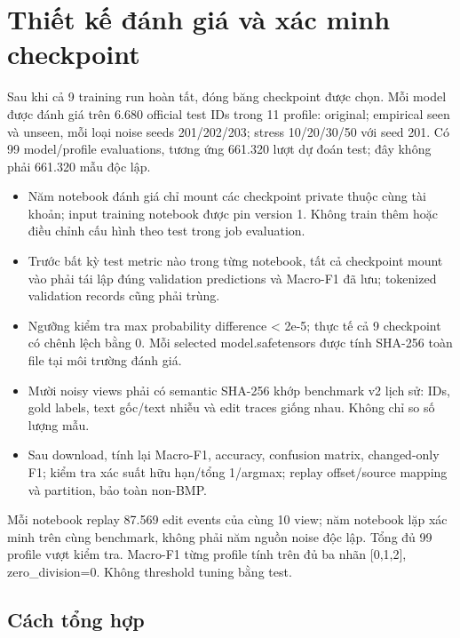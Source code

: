 \documentclass[11pt,a4paper]{article}
\begin{document}
\FloatBarrier\section{Thiết kế đánh giá và xác minh checkpoint}

Sau khi cả 9 training run hoàn tất, đóng băng checkpoint được chọn. Mỗi model được đánh giá trên 6.680 official test IDs trong 11 profile: original; empirical seen và unseen, mỗi loại noise seeds 201/202/203; stress 10/20/30/50 với seed 201. Có 99 model/profile evaluations, tương ứng 661.320 lượt dự đoán test; đây không phải 661.320 mẫu độc lập.


\begin{itemize}

\item Năm notebook đánh giá chỉ mount các checkpoint private thuộc cùng tài khoản; input training notebook được pin version 1. Không train thêm hoặc điều chỉnh cấu hình theo test trong job evaluation.

\item Trước bất kỳ test metric nào trong từng notebook, tất cả checkpoint mount vào phải tái lập đúng validation predictions và Macro-F1 đã lưu; tokenized validation records cũng phải trùng.

\item Ngưỡng kiểm tra max probability difference < 2e-5; thực tế cả 9 checkpoint có chênh lệch bằng 0. Mỗi selected model.safetensors được tính SHA-256 toàn file tại môi trường đánh giá.

\item Mười noisy views phải có semantic SHA-256 khớp benchmark v2 lịch sử: IDs, gold labels, text gốc/text nhiễu và edit traces giống nhau. Không chỉ so số lượng mẫu.

\item Sau download, tính lại Macro-F1, accuracy, confusion matrix, changed-only F1; kiểm tra xác suất hữu hạn/tổng 1/argmax; replay offset/source mapping và partition, bảo toàn non-BMP.

\end{itemize}

Mỗi notebook replay 87.569 edit events của cùng 10 view; năm notebook lặp xác minh trên cùng benchmark, không phải năm nguồn noise độc lập. Tổng đủ 99 profile vượt kiểm tra. Macro-F1 từng profile tính trên đủ ba nhãn [0,1,2], zero\_division=0. Không threshold tuning bằng test.


\subsection*{Cách tổng hợp}
\end{document}
